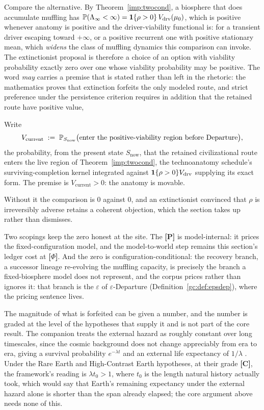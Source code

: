 \begin{proposition}
Compare the alternative. By Theorem~\ref{imp:twocond}, a biosphere
that does accumulate muffling has
$\mathbb{P}(\Lambda_\infty<\infty)=\mathbf{1}\{\rho>0\}\,V_{\mathrm{drv}}(\mu_0)$,
which is positive whenever anatomy is positive and the driver-viability
functional is: for a transient driver escaping toward $+\infty$, or a
positive recurrent one with positive stationary mean, which
\emph{widens} the class of muffling dynamics this comparison can
invoke. The extinctionist proposal is therefore a choice of an option
with viability probability exactly zero over one whose viability
probability may be positive. The word \emph{may} carries a premise that
is stated rather than left in the rhetoric: the mathematics proves that
extinction forfeits the only modeled route, and strict preference under
the persistence criterion requires in addition that the retained route
have positive value,
\begin{premise}\label{hr:prem:option}
Write
\[
V_{\mathrm{current}}\;:=\;\mathbb{P}_{S_{\mathrm{now}}}\bigl(\text{enter the
positive-viability region before Departure}\bigr),
\]
the probability, from the present state $S_{\mathrm{now}}$, that the
retained civilizational route enters the live region of
Theorem~\ref{imp:twocond}, the technoanatomy schedule's
surviving-completion kernel integrated against
$\mathbf{1}\{\rho>0\}V_{\mathrm{drv}}$ supplying its exact form. The premise
is $V_{\mathrm{current}}>0$: the anatomy is movable.
\end{premise}
\noindent Without it the comparison is $0$ against $0$, and an
extinctionist convinced that $\rho$ is irreversibly adverse retains a
coherent objection, which the section takes up rather than dismisses.

Two scopings keep the zero honest at the site. The \textbf{[P]} is
model-internal: it prices the fixed-configuration model, and the
model-to-world step remains this section's ledger cost at
\textbf{[$\Phi$]}. And the zero is configuration-conditional: the
recovery branch, a successor lineage re-evolving the muffling
capacity, is precisely the branch a fixed-biosphere model does not
represent, and the corpus prices rather than ignores it: that branch
is the $\varepsilon$ of $\varepsilon$-Departure
(Definition~\ref{gc:def:epsdep}), where the pricing sentence lives.
\end{proposition}

The magnitude of what is forfeited can be given a number, and the
number is graded at the level of the hypotheses that supply it and is
not part of the core result. The companion treats the external hazard
as roughly constant over long timescales, since the cosmic background
does not change appreciably from era to era, giving a survival
probability $e^{-\lambda t}$ and an external life expectancy of
$1/\lambda$ \cite{Nexus}. Under the Rare Earth and High-Contrast Earth
hypotheses, at their grade \textbf{[C]}, the framework's reading is
$\lambda t_0>1$, where $t_0$ is the length natural history actually
took, which would say that Earth's remaining expectancy under the
external hazard alone is shorter than the span already elapsed; the
core argument above needs none of this.

